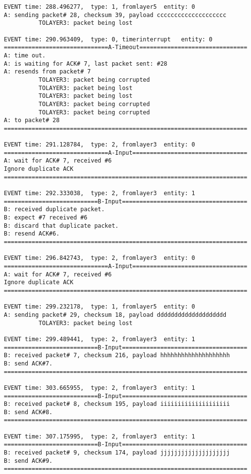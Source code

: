 \documentclass[12pt]{article}
\begin{document}
\begin{verbatim}
EVENT time: 288.496277,  type: 1, fromlayer5  entity: 0
A: sending packet# 28, checksum 39, payload cccccccccccccccccccc
          TOLAYER3: packet being lost

EVENT time: 290.963409,  type: 0, timerinterrupt   entity: 0
==============================A-Timeout===============================
A: time out. 
A: is waiting for ACK# 7, last packet sent: #28
A: resends from packet# 7 
          TOLAYER3: packet being corrupted
          TOLAYER3: packet being lost
          TOLAYER3: packet being lost
          TOLAYER3: packet being corrupted
          TOLAYER3: packet being corrupted
A: to packet# 28
======================================================================

EVENT time: 291.128784,  type: 2, fromlayer3  entity: 0
==============================A-Input=================================
A: wait for ACK# 7, received #6
Ignore duplicate ACK
======================================================================

EVENT time: 292.333038,  type: 2, fromlayer3  entity: 1
===========================B-Input====================================
B: received duplicate packet.
B: expect #7 received #6
B: discard that duplicate packet.
B: resend ACK#6.
======================================================================

EVENT time: 296.842743,  type: 2, fromlayer3  entity: 0
==============================A-Input=================================
A: wait for ACK# 7, received #6
Ignore duplicate ACK
======================================================================

EVENT time: 299.232178,  type: 1, fromlayer5  entity: 0
A: sending packet# 29, checksum 18, payload dddddddddddddddddddd
          TOLAYER3: packet being lost

EVENT time: 299.489441,  type: 2, fromlayer3  entity: 1
===========================B-Input====================================
B: received packet# 7, checksum 216, payload hhhhhhhhhhhhhhhhhhhh
B: send ACK#7.
======================================================================

EVENT time: 303.665955,  type: 2, fromlayer3  entity: 1
===========================B-Input====================================
B: received packet# 8, checksum 195, payload iiiiiiiiiiiiiiiiiiii
B: send ACK#8.
======================================================================

EVENT time: 307.175995,  type: 2, fromlayer3  entity: 1
===========================B-Input====================================
B: received packet# 9, checksum 174, payload jjjjjjjjjjjjjjjjjjjj
B: send ACK#9.
======================================================================


\end{verbatim}
\end{document}
